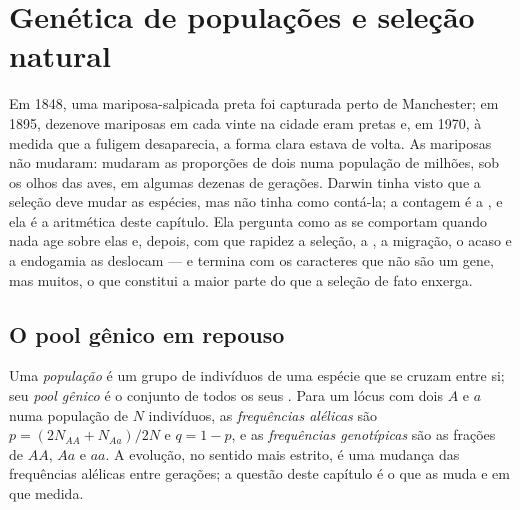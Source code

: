 \chapter{Genética de populações e seleção natural}\label{ch:b2:population-genetics}

Em 1848, uma mariposa-salpicada preta foi capturada perto de Manchester;
em 1895, dezenove mariposas em cada vinte na cidade eram pretas e, em
1970, à medida que a fuligem desaparecia, a forma clara estava de volta.
As mariposas não mudaram: mudaram as proporções de dois  numa
população de milhões, sob os olhos das aves, em algumas dezenas de
gerações. Darwin tinha visto que a seleção deve mudar as espécies, mas
não tinha como contá-la; a contagem é a , e ela é
a aritmética deste capítulo. Ela pergunta como as 
se comportam quando nada age sobre elas e, depois, com que rapidez a
seleção, a , a migração, o acaso e a endogamia as deslocam --- e
termina com os caracteres que não são um gene, mas muitos, o que
constitui a maior parte do que a seleção de fato enxerga.

\section{O pool gênico em repouso}

\begin{definition}\label{def:b2:population-genetics:frequencies}
Uma \emph{população} é um grupo de indivíduos de uma espécie que se
cruzam entre si; seu \emph{pool gênico} é o conjunto de todos os seus
. Para um lócus com dois  $A$ e $a$ numa população 
de $N$ indivíduos, as \emph{frequências alélicas} são $p = (2N_{AA} +
N_{Aa})/2N$ e $q = 1 - p$, e as \emph{frequências genotípicas} são as
frações de $AA$, $Aa$ e $aa$. A evolução, no sentido mais estrito, é uma
mudança das frequências alélicas entre gerações; a questão deste
capítulo é o que as muda e em que medida.
\end{definition}

